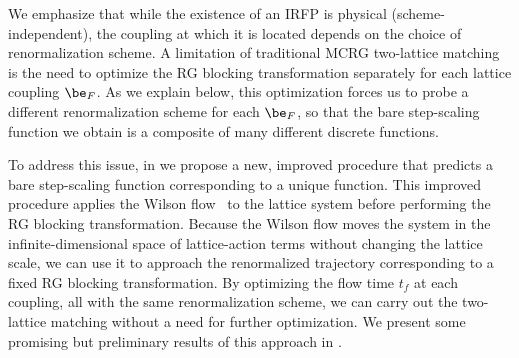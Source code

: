 We emphasize that while the existence of an IRFP is physical (scheme-independent), the coupling at which it is located depends on the choice of renormalization scheme.
A limitation of traditional MCRG two-lattice matching is the need to optimize the RG blocking transformation separately for each lattice coupling $\be_F$.
As we explain below, this optimization forces us to probe a different renormalization scheme for each $\be_F$, so that the bare step-scaling function we obtain is a composite of many different discrete \be functions.

To address this issue, in  we propose a new, improved procedure that predicts a bare step-scaling function corresponding to a unique \be function.
This improved procedure applies the Wilson flow~\cite{Narayanan:2006rf, Luscher:2010iy} to the lattice system before performing the RG blocking transformation.
Because the Wilson flow moves the system in the infinite-dimensional space of lattice-action terms without changing the lattice scale, we can use it to approach the renormalized trajectory corresponding to a fixed RG blocking transformation.
By optimizing the flow time $t_f$ at each coupling, all with the same renormalization scheme, we can carry out the two-lattice matching without a need for further optimization.
We present some promising but preliminary results of this approach in .
